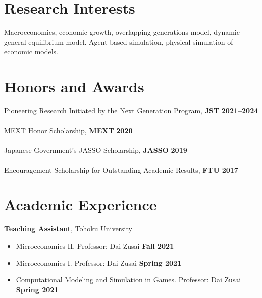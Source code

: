 \documentclass[margin,line]{res}
\begin{document}
\begin{resume}

\section{\sc Research Interests}
	Macroeconomics, economic growth, overlapping generations model, dynamic general equilibrium model. Agent-based simulation, physical simulation of economic models.

\section{\sc Honors and Awards}
Pioneering Research Initiated by the Next Generation Program, {\bf JST} \hfill {\bf 2021--2024}\\
\\
MEXT Honor Scholarship, {\bf MEXT} \hfill {\bf 2020}\\
\\
Japanese Government's JASSO Scholarship, {\bf JASSO} \hfill {\bf 2019}\\
\\
Encouragement Scholarship for Outstanding Academic Results, {\bf FTU} \hfill {\bf 2017}\\

\vspace{-1em}

\section{\sc Academic Experience}
{\bf Teaching Assistant}, Tohoku University
\vspace*{.05in}
\begin{itemize}
\item[ ] Microeconomics II. Professor: Dai Zusai \hfill {\bf Fall 2021}
\item[ ] Microeconomics I. Professor: Dai Zusai \hfill {\bf Spring 2021}
\item[ ] Computational Modeling and Simulation in Games. Professor: Dai Zusai \hfill {\bf Spring 2021}
\end{itemize}


\end{resume}
\end{document}
